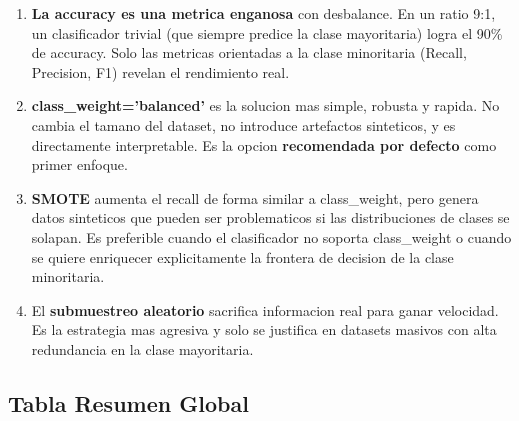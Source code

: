 \documentclass[12pt,a4paper]{article}
\begin{document}
\begin{enumerate}[label=\textbf{\arabic*.}]
  \item \textbf{La accuracy es una metrica enganosa} con desbalance. En un ratio 9:1, un
    clasificador trivial (que siempre predice la clase mayoritaria) logra el 90\% de accuracy.
    Solo las metricas orientadas a la clase minoritaria (Recall, Precision, F1) revelan el
    rendimiento real.

  \item \textbf{class\_weight='balanced'} es la solucion mas simple, robusta y rapida. No
    cambia el tamano del dataset, no introduce artefactos sinteticos, y es directamente
    interpretable. Es la opcion \textbf{recomendada por defecto} como primer enfoque.

  \item \textbf{SMOTE} aumenta el recall de forma similar a class\_weight, pero genera datos
    sinteticos que pueden ser problematicos si las distribuciones de clases se solapan. Es
    preferible cuando el clasificador no soporta class\_weight o cuando se quiere enriquecer
    explicitamente la frontera de decision de la clase minoritaria.

  \item El \textbf{submuestreo aleatorio} sacrifica informacion real para ganar velocidad. Es
    la estrategia mas agresiva y solo se justifica en datasets masivos con alta redundancia en
    la clase mayoritaria.
\end{enumerate}

\subsection{Tabla Resumen Global}
\end{document}
